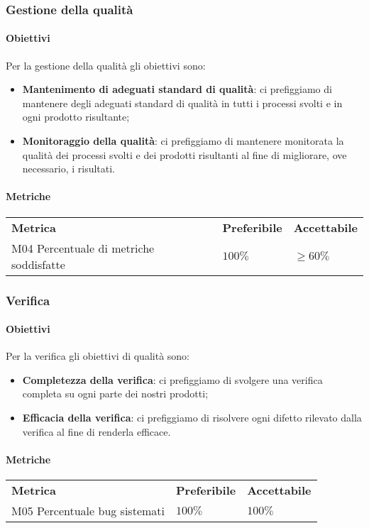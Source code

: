 		\subsubsection{Gestione della qualità}
			\paragraph{Obiettivi}
			Per la gestione della qualità gli obiettivi sono:
			\begin{itemize}
				\item \textbf{Mantenimento di adeguati standard di qualità}: ci prefiggiamo di mantenere degli adeguati standard di qualità in tutti i processi svolti e in ogni prodotto risultante;
				\item \textbf{Monitoraggio della qualità}: ci prefiggiamo di mantenere monitorata la qualità dei processi svolti e dei prodotti risultanti al fine di migliorare, ove necessario, i risultati.
			\end{itemize}	 
			\paragraph{Metriche} \mbox{} 
			\begin{longtable} {
					>{}p{80mm} 
					>{}p{25mm}
					>{}p{25mm}
				}
				\rowcolor{gray!50}
				\textbf{Metrica} & \textbf{Preferibile} & \textbf{Accettabile} \TBstrut \TBstrut \\
				M04 Percentuale di metriche soddisfatte & $100\%$ & $\ge 60\%$ \TBstrut \\ [2mm]
			\end{longtable}

		\subsubsection{Verifica}
			\paragraph{Obiettivi}
			Per la verifica gli obiettivi di qualità sono:
			\begin{itemize}
				\item \textbf{Completezza della verifica}: ci prefiggiamo di svolgere una verifica completa su ogni parte dei nostri prodotti;
				\item \textbf{Efficacia della verifica}: ci prefiggiamo di risolvere ogni difetto rilevato dalla verifica al fine di renderla efficace.
			\end{itemize}
			\paragraph{Metriche} \mbox{}
			\begin{longtable} {
					>{}p{80mm} 
					>{}p{25mm}
					>{}p{25mm}
				}
				\rowcolor{gray!50}
				\textbf{Metrica} & \textbf{Preferibile} & \textbf{Accettabile} \TBstrut \TBstrut \\
				M05 Percentuale bug sistemati & $100\%$ & $100\%$ \TBstrut \\ [2mm]
			\end{longtable}
			
